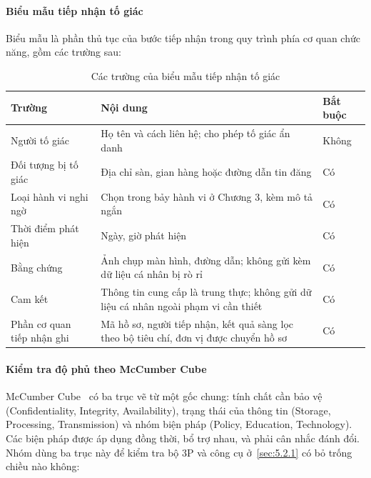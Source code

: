 \paragraph{Biểu mẫu tiếp nhận tố giác}

Biểu mẫu là phần thủ tục của bước tiếp nhận trong quy trình phía cơ quan chức năng, gồm các trường sau:

{\small{}
\begin{table}[H]
\centering
\caption{Các trường của biểu mẫu tiếp nhận tố giác}\label{tab:5.12}
\begin{tabularx}{\textwidth}{>{\hsize=0.541\hsize\raggedright\arraybackslash}X>{\hsize=1.459\hsize\raggedright\arraybackslash}X>{\raggedright\arraybackslash}l}
\toprule
\textbf{Trường} & \textbf{Nội dung} & \textbf{Bắt buộc} \\
\midrule
Người tố giác & Họ tên và cách liên hệ; cho phép tố giác ẩn danh & Không \\
Đối tượng bị tố giác & Địa chỉ sàn, gian hàng hoặc đường dẫn tin đăng & Có \\
Loại hành vi nghi ngờ & Chọn trong bảy hành vi ở Chương 3, kèm mô tả ngắn & Có \\
Thời điểm phát hiện & Ngày, giờ phát hiện & Có \\
Bằng chứng & Ảnh chụp màn hình, đường dẫn; không gửi kèm dữ liệu cá nhân bị rò rỉ & Có \\
Cam kết & Thông tin cung cấp là trung thực; không gửi dữ liệu cá nhân ngoài phạm vi cần thiết & Có \\
Phần cơ quan tiếp nhận ghi & Mã hồ sơ, người tiếp nhận, kết quả sàng lọc theo bộ tiêu chí, đơn vị được chuyển hồ sơ & Có \\
\bottomrule
\end{tabularx}
\end{table}}


\paragraph{Kiểm tra độ phủ theo McCumber Cube}

McCumber Cube~\cite{lpsc-l1} có ba trục vẽ từ một gốc chung: tính chất cần bảo vệ (Confidentiality, Integrity, Availability), trạng thái của thông tin (Storage, Processing, Transmission) và nhóm biện pháp (Policy, Education, Technology). Các biện pháp được áp dụng đồng thời, bổ trợ nhau, và phải cân nhắc đánh đổi. Nhóm dùng ba trục này để kiểm tra bộ 3P và công cụ ở~\ref{sec:5.2.1} có bỏ trống chiều nào không:

